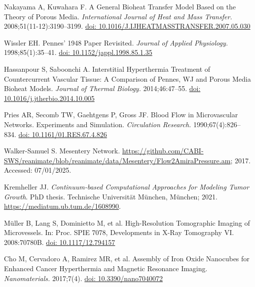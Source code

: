 \documentclass[Times1COL,AMA]{WileyNJDv5} %
\begin{document}
\begin{thebibliography}{10}
    Nakayama A, Kuwahara F. A General Bioheat Transfer Model Based on the Theory of
    Porous Media. {\it International Journal of Heat and Mass Transfer.}
    2008\string;51(11-12)\string:3190--3199.
    \newblock \href {\doibase 10.1016/J.IJHEATMASSTRANSFER.2007.05.030} {doi:
        10.1016/J.IJHEATMASSTRANSFER.2007.05.030}

    Wissler EH. Pennes' 1948 Paper Revisited. {\it Journal of Applied Physiology.}
    1998\string;85(1)\string:35--41.
    \newblock \href {\doibase 10.1152/jappl.1998.85.1.35} {doi:
        10.1152/jappl.1998.85.1.35}

    Hassanpour S, Saboonchi A. Interstitial Hyperthermia Treatment of
    Countercurrent Vascular Tissue: {{A}} Comparison of {{Pennes}}, {{WJ}} and
    Porous Media Bioheat Models. {\it Journal of Thermal Biology.}
    2014\string;46\string:47--55.
    \newblock \href {\doibase 10.1016/j.jtherbio.2014.10.005} {doi:
        10.1016/j.jtherbio.2014.10.005}

    Pries AR, Secomb TW, Gaehtgens P, Gross JF. Blood Flow in Microvascular
    Networks. {{Experiments}} and Simulation. {\it Circulation Research.}
    1990\string;67(4)\string:826--834.
    \newblock \href {\doibase 10.1161/01.RES.67.4.826} {doi:
        10.1161/01.RES.67.4.826}

    {Walker-Samuel} S. Mesentery {{Network}}.
    \url{https://github.com/CABI-SWS/reanimate/blob/reanimate/data/Mesentery/Flow2AmiraPressure.am};
    2017.
    \newblock Accessed: 07/01/2025.

    Kremheller JJ. {\it {Continuum-based Computational Approaches for Modeling
                Tumor Growth}}. PhD thesis. Technische Universit{\"a}t M{\"u}nchen,
    M{\"u}nchen;  2021.
    \newblock \url{https://mediatum.ub.tum.de/1608990}.

    M{\"u}ller B, Lang S, Dominietto M, et al. High-Resolution Tomographic Imaging
    of Microvessels. In: Proc. SPIE 7078, Developments in X-Ray Tomography VI.
    2008\string:70780B.
    \newblock \href{https://doi.org/10.1117/12.794157}{doi: 10.1117/12.794157}

    Cho M, Cervadoro A, Ramirez MR, et al. Assembly of {{Iron Oxide Nanocubes}} for
        {{Enhanced Cancer Hyperthermia}} and {{Magnetic Resonance Imaging}}. {\it
    Nanomaterials.} 2017\string;7(4).
    \newblock \href {\doibase 10.3390/nano7040072} {doi: 10.3390/nano7040072}

\end{thebibliography}
\end{document}
